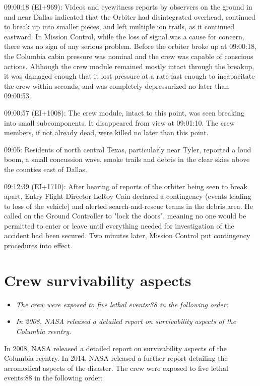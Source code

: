 09:00:18 (EI+969): Videos and eyewitness reports by observers on the
ground in and near Dallas indicated that the Orbiter had disintegrated
overhead, continued to break up into smaller pieces, and left multiple
ion trails, as it continued eastward. In Mission Control, while the loss
of signal was a cause for concern, there was no sign of any serious
problem. Before the orbiter broke up at 09:00:18, the Columbia cabin
pressure was nominal and the crew was capable of conscious actions.
Although the crew module remained mostly intact through the breakup, it
was damaged enough that it lost pressure at a rate fast enough to
incapacitate the crew within seconds, and was completely depressurized
no later than 09:00:53.

09:00:57 (EI+1008): The crew module, intact to this point, was seen
breaking into small subcomponents. It disappeared from view at 09:01:10.
The crew members, if not already dead, were killed no later than this
point.

09:05: Residents of north central Texas, particularly near Tyler,
reported a loud boom, a small concussion wave, smoke trails and debris
in the clear skies above the counties east of Dallas.

09:12:39 (EI+1710): After hearing of reports of the orbiter being seen
to break apart, Entry Flight Director LeRoy Cain declared a contingency
(events leading to loss of the vehicle) and alerted search-and-rescue
teams in the debris area. He called on the Ground Controller to "lock
the doors", meaning no one would be permitted to enter or leave until
everything needed for investigation of the accident had been secured.
Two minutes later, Mission Control put contingency procedures into
effect.

\section{Crew survivability aspects}\label{crew-survivability-aspects}

\begin{itemize}
\item
  \emph{The crew were exposed to five lethal events:88 in the following
  order:}
\item
  \emph{In 2008, NASA released a detailed report on survivability
  aspects of the Columbia reentry.}
\end{itemize}

In 2008, NASA released a detailed report on survivability aspects of the
Columbia reentry. In 2014, NASA released a further report detailing the
aeromedical aspects of the disaster. The crew were exposed to five
lethal events:88 in the following order:

